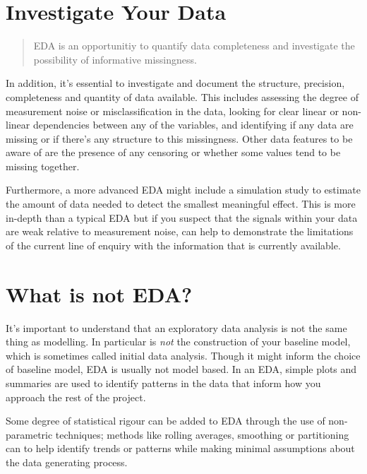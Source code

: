\documentclass[
  letterpaper,
  DIV=11,
  numbers=noendperiod]{scrreprt}
\begin{document}
\section{Investigate Your Data}\label{investigate-your-data}

\begin{quote}
EDA is an opportunitiy to quantify data completeness and investigate the
possibility of informative missingness.
\end{quote}

In addition, it's essential to investigate and document the structure,
precision, completeness and quantity of data available. This includes
assessing the degree of measurement noise or misclassification in the
data, looking for clear linear or non-linear dependencies between any of
the variables, and identifying if any data are missing or if there's any
structure to this missingness. Other data features to be aware of are
the presence of any censoring or whether some values tend to be missing
together.

Furthermore, a more advanced EDA might include a simulation study to
estimate the amount of data needed to detect the smallest meaningful
effect. This is more in-depth than a typical EDA but if you suspect that
the signals within your data are weak relative to measurement noise, can
help to demonstrate the limitations of the current line of enquiry with
the information that is currently available.

\section{What is not EDA?}\label{what-is-not-eda}

It's important to understand that an exploratory data analysis is not
the same thing as modelling. In particular is \emph{not} the
construction of your baseline model, which is sometimes called initial
data analysis. Though it might inform the choice of baseline model, EDA
is usually not model based. In an EDA, simple plots and summaries are
used to identify patterns in the data that inform how you approach the
rest of the project.

Some degree of statistical rigour can be added to EDA through the use of
non-parametric techniques; methods like rolling averages, smoothing or
partitioning can to help identify trends or patterns while making
minimal assumptions about the data generating process.
\end{document}
